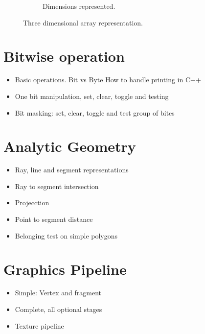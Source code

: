 \begin{figure}[htp]
\begin{subfigure}[b]{0.2\textwidth}
    \caption{Dimensions represented.}
    \label{fig:3b}
  \end{subfigure}
  \caption{Three dimensional array representation.}
  \label{fig:3D}
\end{figure}

\section{Bitwise operation}
\begin{itemize}
  \item Basic operations. Bit vs Byte How to handle printing in C++
  \item One bit manipulation, set, clear, toggle and testing
  \item Bit masking: set, clear, toggle and test group of bites
\end{itemize}

\section{Analytic Geometry}
\begin{itemize}
  \item Ray, line and segment representations
  \item Ray to segment intersection
  \item Projecction
  \item Point to segment distance
  \item Belonging test on simple polygons
\end{itemize}

\section{Graphics Pipeline}
\begin{itemize}
  \item Simple: Vertex and fragment
  \item Complete, all optional stages
  \item Texture pipeline
\end{itemize}
